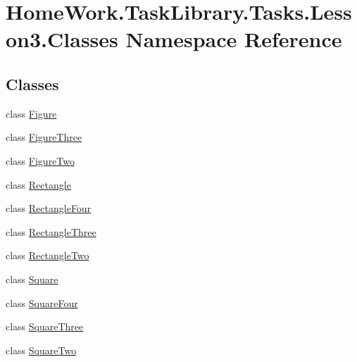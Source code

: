 \hypertarget{namespace_home_work_1_1_task_library_1_1_tasks_1_1_lesson3_1_1_classes}{}\section{Home\+Work.\+Task\+Library.\+Tasks.\+Lesson3.\+Classes Namespace Reference}
\label{namespace_home_work_1_1_task_library_1_1_tasks_1_1_lesson3_1_1_classes}
\subsection*{Classes}
\begin{DoxyCompactItemize}
\item 
class \mbox{\hyperlink{class_home_work_1_1_task_library_1_1_tasks_1_1_lesson3_1_1_classes_1_1_figure}{Figure}}
\item 
class \mbox{\hyperlink{class_home_work_1_1_task_library_1_1_tasks_1_1_lesson3_1_1_classes_1_1_figure_three}{Figure\+Three}}
\item 
class \mbox{\hyperlink{class_home_work_1_1_task_library_1_1_tasks_1_1_lesson3_1_1_classes_1_1_figure_two}{Figure\+Two}}
\item 
class \mbox{\hyperlink{class_home_work_1_1_task_library_1_1_tasks_1_1_lesson3_1_1_classes_1_1_rectangle}{Rectangle}}
\item 
class \mbox{\hyperlink{class_home_work_1_1_task_library_1_1_tasks_1_1_lesson3_1_1_classes_1_1_rectangle_four}{Rectangle\+Four}}
\item 
class \mbox{\hyperlink{class_home_work_1_1_task_library_1_1_tasks_1_1_lesson3_1_1_classes_1_1_rectangle_three}{Rectangle\+Three}}
\item 
class \mbox{\hyperlink{class_home_work_1_1_task_library_1_1_tasks_1_1_lesson3_1_1_classes_1_1_rectangle_two}{Rectangle\+Two}}
\item 
class \mbox{\hyperlink{class_home_work_1_1_task_library_1_1_tasks_1_1_lesson3_1_1_classes_1_1_square}{Square}}
\item 
class \mbox{\hyperlink{class_home_work_1_1_task_library_1_1_tasks_1_1_lesson3_1_1_classes_1_1_square_four}{Square\+Four}}
\item 
class \mbox{\hyperlink{class_home_work_1_1_task_library_1_1_tasks_1_1_lesson3_1_1_classes_1_1_square_three}{Square\+Three}}
\item 
class \mbox{\hyperlink{class_home_work_1_1_task_library_1_1_tasks_1_1_lesson3_1_1_classes_1_1_square_two}{Square\+Two}}
\end{DoxyCompactItemize}
